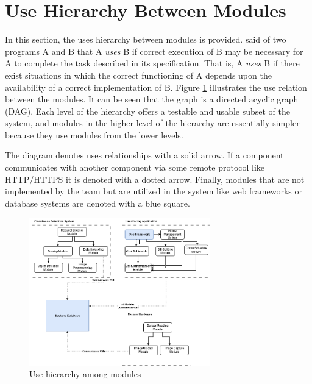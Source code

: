 \documentclass[12pt, titlepage]{article}
\begin{document}
\section{Use Hierarchy Between Modules} \label{SecUse}

In this section, the uses hierarchy between modules is
provided. \citet{Parnas1978} said of two programs A and B that A {\em uses} B if
correct execution of B may be necessary for A to complete the task described in
its specification. That is, A {\em uses} B if there exist situations in which
the correct functioning of A depends upon the availability of a correct
implementation of B.  Figure \ref{FigUH} illustrates the use relation between
the modules. It can be seen that the graph is a directed acyclic graph
(DAG). Each level of the hierarchy offers a testable and usable subset of the
system, and modules in the higher level of the hierarchy are essentially simpler
because they use modules from the lower levels.

The diagram denotes uses relationships with a solid arrow. If a component  communicates with another component via some remote protocol like HTTP/HTTPS it is denoted with a dotted arrow. Finally, modules that are not implemented by the team but are utilized in the system like web frameworks or database systems are denoted with a blue square.


\begin{figure}[H]
\centering
\includegraphics[width=0.7\textwidth]{UsesHierarchy.png}
\caption{Use hierarchy among modules}
\label{FigUH}
\end{figure}



\end{document}
